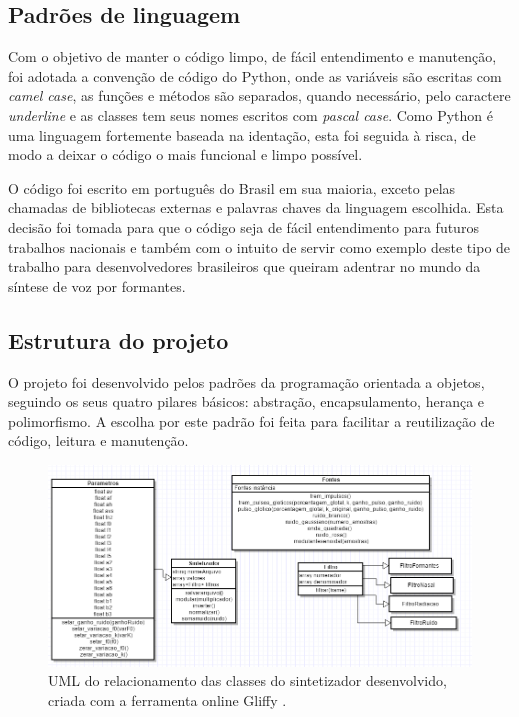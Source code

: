 \documentclass[
  12pt,       
  openright,      
  twoside,      
  a4paper,      
  english,      
  french,       
  spanish,      
  brazil,     
  ]{abntex2}
\begin{document}
\subsection{Padrões de linguagem}
Com o objetivo de manter o código limpo, de fácil entendimento e manutenção, foi adotada a convenção de código do Python, onde as variáveis são escritas com \textit{camel case}, as funções e métodos são separados, quando necessário, pelo caractere \textit{underline} e as classes tem seus nomes escritos com \textit{pascal case}. Como Python é uma linguagem fortemente baseada na identação, esta foi seguida à risca, de modo a deixar o código o mais funcional e limpo possível.

O código foi escrito em português do Brasil em sua maioria, exceto pelas chamadas de bibliotecas externas e palavras chaves da linguagem escolhida. Esta decisão foi tomada para que o código seja de fácil entendimento para futuros trabalhos nacionais e também com o intuito de servir como exemplo deste tipo de trabalho para desenvolvedores brasileiros que queiram adentrar no mundo da síntese de voz por formantes.

\subsection{Estrutura do projeto}
O projeto foi desenvolvido pelos padrões da programação orientada a objetos, seguindo os seus quatro pilares básicos: abstração, encapsulamento, herança e polimorfismo. A escolha por este padrão foi feita para facilitar a reutilização de código, leitura e manutenção.

\begin{figure}
\includegraphics[width=\textwidth,keepaspectratio]{imagens/umlSintetizadorKlatt.PNG}
\caption{UML do relacionamento das classes do sintetizador desenvolvido, criada com a ferramenta online Gliffy \cite{gliffy}.}
\label{fig:umlsintetizador}
\end{figure}
\end{document}

